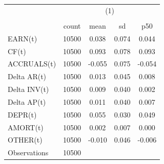 {
\def\sym#1{\ifmmode^{#1}\else\(^{#1}\)\fi}
\begin{tabular}{l*{1}{cccc}}
\hline\hline
                    &\multicolumn{4}{c}{(1)}                            \\
                    &\multicolumn{4}{c}{}                               \\
                    &       count&        mean&          sd&         p50\\
\hline
EARN(t)             &       10500&       0.038&       0.074&       0.044\\
CF(t)               &       10500&       0.093&       0.078&       0.093\\
ACCRUALS(t)         &       10500&      -0.055&       0.075&      -0.054\\
Delta AR(t)         &       10500&       0.013&       0.045&       0.008\\
Delta INV(t)        &       10500&       0.009&       0.040&       0.002\\
Delta AP(t)         &       10500&       0.011&       0.040&       0.007\\
DEPR(t)             &       10500&       0.055&       0.030&       0.049\\
AMORT(t)            &       10500&       0.002&       0.007&       0.000\\
OTHER(t)            &       10500&      -0.010&       0.046&      -0.006\\
\hline
Observations        &       10500&            &            &            \\
\hline\hline
\end{tabular}
}
